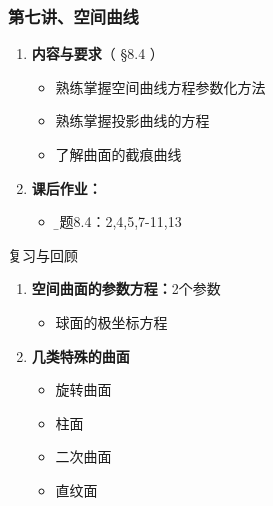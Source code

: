 
\begin{frame}
	\frametitle{第七讲、空间曲线}
	\linespread{1.5}
	\begin{enumerate}
	  \item {\bf 内容与要求}{\color{blue}（ \S8.4 ）}
	  \begin{itemize}
	    \item 熟练掌握空间曲线方程参数化方法
	    \item 熟练掌握投影曲线的方程
	    \item 了解曲面的截痕曲线
	  \vspace{1em}
	  \end{itemize}
	  \item {\bf  课后作业：}
	  \begin{itemize}
	    \item {\b 习题8.4：2,4,5,7-11,13}
	  \end{itemize}
	\end{enumerate}
\end{frame}

\begin{frame}[<+->]{复习与回顾}
	\linespread{1.5}
	\begin{enumerate}
	  \item {\bf 空间曲面的参数方程：}2个参数
	  \begin{itemize}
	    \item 球面的极坐标方程
	  \end{itemize}
	  \item {\bf 几类特殊的曲面}
	  \begin{itemize}
	    \item 旋转曲面
	    \item 柱面
	    \item 二次曲面
	    \item 直纹面
	  \end{itemize}
	\end{enumerate}
\end{frame}

